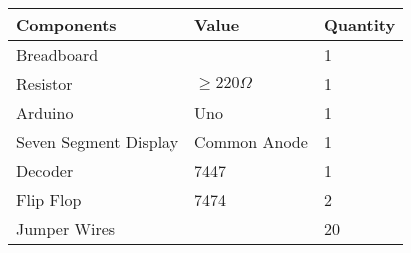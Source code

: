                               \label{table:1}
\begin{tabular}{|p{4cm}|p{3cm}|p{3cm}|}
\hline                                        
\textbf{Components} & \textbf{Value} & \textbf{Quantity}\\                                          
\hline                                 
Breadboard &      & 1 \\           
\hline                                    
Resistor & $ \geq 220\Omega $ & 1 \\     
\hline                      
Arduino & Uno & 1 \\       
\hline                                     
Seven Segment Display & Common Anode & 1\\
\hline                      
Decoder & 7447 & 1 \\        
\hline                     
Flip Flop & 7474 & 2 \\
\hline                        
Jumper Wires &    & 20\\   
\hline
\end{tabular}
